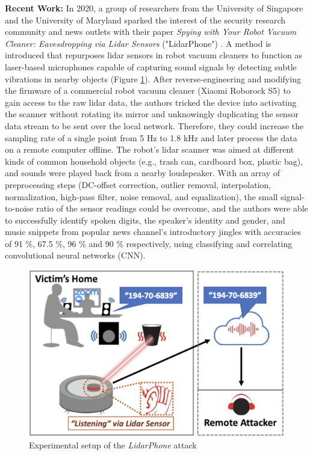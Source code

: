 \documentclass[sigconf, nonacm]{acmart}
\begin{document}
\textbf{Recent Work:} In 2020, a group of researchers from the University of Singapore and the University of Maryland sparked the interest of the security research community \cite{BitdefenderRobotVacuumEavesdrop} and news outlets \cite{ForbesRobotVacuumEavesdrop} with their paper \textit{Spying with Your Robot Vacuum Cleaner: Eavesdropping via Lidar Sensors} ("LidarPhone") \cite{LidarPhone2020}. A method is introduced that repurposes lidar sensors in robot vacuum cleaners to function as laser-based microphones capable of capturing sound signals by detecting subtle vibrations in nearby objects (Figure \ref{fig:LidarphoneSetup}).
After reverse-engineering and modifying the firmware of a commercial robot vacuum cleaner (Xiaomi Roborock S5) to gain access to the raw lidar data, the authors tricked the device into activating the scanner without rotating its mirror and unknowingly duplicating the sensor data stream to be sent over the local network. Therefore, they could increase the sampling rate of a single point from 5 Hz to 1.8 kHz and later process the data on a remote computer offline.
The robot's lidar scanner was aimed at different kinds of common household objects (e.g., trash can, cardboard box, plastic bag), and sounds were played back from a nearby loudspeaker.
With an array of preprocessing steps (DC-offset correction, outlier removal, interpolation, normalization, high-pass filter, noise removal, and equalization), the small signal-to-noise ratio of the sensor readings could be overcome, and the authors were able to successfully identify spoken digits, the speaker's identity and gender, and music snippets from popular news channel's introductory jingles with accuracies of 91 \%, 67.5 \%, 96 \% and 90 \% respectively, using classifying and correlating convolutional neural networks (CNN).

\begin{figure}[H]
\centering
\includegraphics[width=\linewidth]{embed/Lidarphone_setup.png}
\caption{Experimental setup of the \textit{LidarPhone} attack \cite{LidarPhone2020}}
\label{fig:LidarphoneSetup}
\end{figure}
\end{document}
